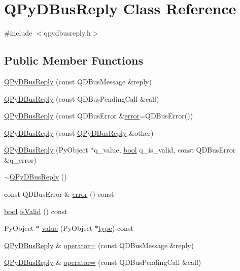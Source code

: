 \hypertarget{classQPyDBusReply}{}\section{Q\+Py\+D\+Bus\+Reply Class Reference}
\label{classQPyDBusReply}


{\ttfamily \#include $<$qpydbusreply.\+h$>$}

\subsection*{Public Member Functions}
\begin{DoxyCompactItemize}
\item 
\hyperlink{classQPyDBusReply_aabf44223394a744c3037c9ad77ee2e38}{Q\+Py\+D\+Bus\+Reply} (const Q\+D\+Bus\+Message \&reply)
\item 
\hyperlink{classQPyDBusReply_a63c1834f99fb18add0287643c4608912}{Q\+Py\+D\+Bus\+Reply} (const Q\+D\+Bus\+Pending\+Call \&call)
\item 
\hyperlink{classQPyDBusReply_a13168abf1881a183037ebac28260ea78}{Q\+Py\+D\+Bus\+Reply} (const Q\+D\+Bus\+Error \&\hyperlink{classQPyDBusReply_ab500ed32531402b0ab3d44c37fc8ad1d}{error}=Q\+D\+Bus\+Error())
\item 
\hyperlink{classQPyDBusReply_a402b2afa89385aeae5a0bf3b96b88bf5}{Q\+Py\+D\+Bus\+Reply} (const \hyperlink{classQPyDBusReply}{Q\+Py\+D\+Bus\+Reply} \&other)
\item 
\hyperlink{classQPyDBusReply_a1abb04ece60425057e646a810f9dd6d9}{Q\+Py\+D\+Bus\+Reply} (Py\+Object $\ast$q\+\_\+value, \hyperlink{compiler_8h_abb452686968e48b67397da5f97445f5b}{bool} q\+\_\+is\+\_\+valid, const Q\+D\+Bus\+Error \&q\+\_\+error)
\item 
\hyperlink{classQPyDBusReply_a62f1d7da57d91875a09008d3c61b5b9d}{$\sim$\+Q\+Py\+D\+Bus\+Reply} ()
\item 
const Q\+D\+Bus\+Error \& \hyperlink{classQPyDBusReply_ab500ed32531402b0ab3d44c37fc8ad1d}{error} () const 
\item 
\hyperlink{compiler_8h_abb452686968e48b67397da5f97445f5b}{bool} \hyperlink{classQPyDBusReply_a4cc57ff2a5c4c2e091854903bd9f68d1}{is\+Valid} () const 
\item 
Py\+Object $\ast$ \hyperlink{classQPyDBusReply_a2982d65987d4db006ad3b454260df098}{value} (Py\+Object $\ast$\hyperlink{fftw__dct_8c_a7aead736a07eaf25623ad7bfa1f0ee2d}{type}) const 
\item 
\hyperlink{classQPyDBusReply}{Q\+Py\+D\+Bus\+Reply} \& \hyperlink{classQPyDBusReply_a6328c9e4ddc71b07f01818d31743f586}{operator=} (const Q\+D\+Bus\+Message \&reply)
\item 
\hyperlink{classQPyDBusReply}{Q\+Py\+D\+Bus\+Reply} \& \hyperlink{classQPyDBusReply_afe1146e2014555cc9b7220341c7336b9}{operator=} (const Q\+D\+Bus\+Pending\+Call \&call)
\end{DoxyCompactItemize}


